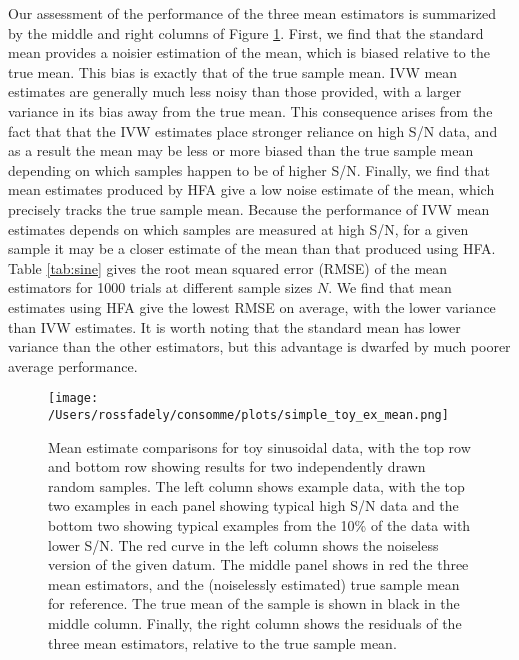 \documentclass[12pt,preprint]{aastex}
\begin{document}
Our assessment of the performance of the three mean estimators is summarized by the middle 
and right columns of Figure \ref{fig:sine-toy-mean}.  First, we find that the standard mean provides 
a noisier estimation of the mean, which is biased relative to the true mean.  This bias is exactly 
that of the true sample mean.  IVW mean estimates are generally much less 
noisy than those provided, with a larger variance in its bias away from the true mean.  This 
consequence arises from the fact that that the IVW estimates place 
stronger reliance on high S/N data, and as a result the mean may be less or more biased than 
the true sample mean depending on which samples happen to be of higher S/N.  Finally, we find that 
mean estimates produced by HFA give a low noise estimate of the mean, which precisely tracks 
the true sample mean.  Because the performance of IVW mean estimates depends on which samples 
are measured at high S/N, for a given sample it may be a closer estimate of the mean than that 
produced using HFA.  Table \ref{tab:sine} gives the root mean squared error (RMSE) of the mean 
estimators for 1000 trials at different sample sizes $N$.  We find that mean estimates using HFA 
give the lowest RMSE on average, with the lower variance than IVW estimates.  It is worth noting 
that the standard mean has lower variance than the other estimators, but this advantage is dwarfed 
by much poorer average performance.

\begin{figure}[ht]
\centering
 \texttt{[image: /Users/rossfadely/consomme/plots/simple\_toy\_ex\_mean.png]}
\caption{Mean estimate comparisons for toy sinusoidal data, with the top row and bottom row showing results for two independently drawn random samples.  The left column shows example data, with the top two examples in each panel showing typical high S/N data and the bottom two showing typical examples from the 10\% of the data with lower S/N.  The red curve in the left column shows the noiseless version of the given datum.  The middle panel shows in red the three mean estimators, and the (noiselessly estimated) true sample mean for reference.  The true mean of the sample is shown in black in the middle column.  Finally, the right column shows the residuals of the three mean estimators, relative to the true sample mean.}
\label{fig:sine-toy-mean}
\end{figure}
\end{document}
